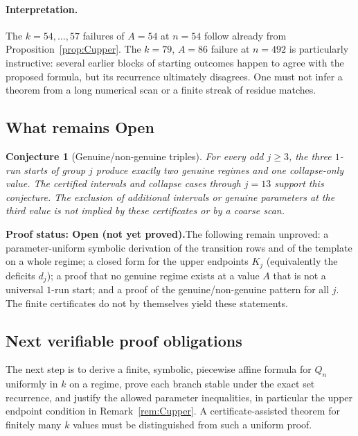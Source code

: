 \documentclass[11pt]{article}
\newtheorem{conjecture}[theorem]{Conjecture}
\theoremstyle{remark}
\newcommand{\statusopen}{\textbf{Proof status: Open (not yet proved).}}
\begin{document}
\paragraph{Interpretation.} The $k=54,\ldots,57$ failures of $A=54$ at $n=54$ follow already from Proposition~\ref{prop:Cupper}. The $k=79$, $A=86$ failure at $n=492$ is particularly instructive: several earlier blocks of starting outcomes happen to agree with the proposed formula, but its recurrence ultimately disagrees. One must not infer a theorem from a long numerical scan or a finite streak of residue matches.

\subsection{What remains Open}
\begin{conjecture}[Genuine/non-genuine triples]\label{conj:Chierarchy}
For every odd $j\ge3$, the three $1$-run starts of group $j$ produce exactly two genuine regimes and one collapse-only value. The certified intervals and collapse cases through $j=13$ support this conjecture. The exclusion of additional intervals or genuine parameters at the third value is not implied by these certificates or by a coarse scan.
\end{conjecture}
\statusopen\quad The following remain unproved: a parameter-uniform symbolic derivation of the transition rows and of the template on a whole regime; a closed form for the upper endpoints $K_j$ (equivalently the deficits $d_j$); a proof that no genuine regime exists at a value $A$ that is not a universal $1$-run start; and a proof of the genuine/non-genuine pattern for all $j$. The finite certificates do not by themselves yield these statements.

\subsection{Next verifiable proof obligations}
The next step is to derive a finite, symbolic, piecewise affine formula for $Q_n$ uniformly in $k$ on a regime, prove each branch stable under the exact set recurrence, and justify the allowed parameter inequalities, in particular the upper endpoint condition in Remark~\ref{rem:Cupper}. A certificate-assisted theorem for finitely many $k$ values must be distinguished from such a uniform proof.\par
\end{document}
